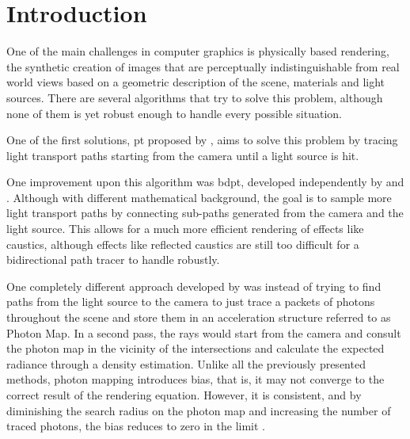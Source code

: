 \chapter{Introduction}

One of the main challenges in computer graphics is physically based rendering, the synthetic creation of images that are perceptually indistinguishable from real world views based on a geometric description of the scene, materials and light sources. There are several algorithms that try to solve this problem, although none of them is yet robust enough to handle every possible situation.

One of the first solutions, \gls{pt} proposed by \cite{Kajiya}, aims to solve this problem by tracing light transport paths starting from the camera until a light source is hit.

One improvement upon this algorithm was \gls{bdpt}, developed independently by \cite{Lafortune} and \cite{Veach}. Although with different mathematical background, the goal is to sample more light transport paths by connecting sub-paths generated from the camera and the light source. This allows for a much more efficient rendering of effects like caustics, although
effects like reflected caustics are still too difficult for a bidirectional path tracer to handle robustly.


One completely different approach developed by \cite{Jensen} was instead of trying to find paths from the light source to the camera to just trace a packets of photons throughout the scene and store them in an acceleration structure referred to as Photon Map. In a second pass, the rays would start from the camera and consult the photon map in the vicinity of the intersections and calculate the expected radiance through a density estimation. Unlike all the previously presented methods, photon mapping introduces bias, that is, it may not converge to the correct result of the rendering equation. However, it is consistent, and by diminishing the search radius on the photon map and increasing the number of traced photons, the bias reduces to zero in the limit \citep{Hachisuka}.

